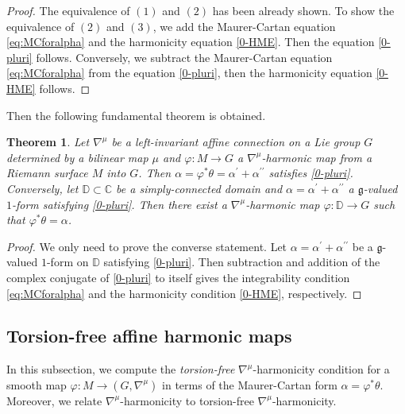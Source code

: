 \documentclass[12pt]{amsart}
\newtheorem{Theorem}{Theorem}[section]
\theoremstyle{definition}
\theoremstyle{remark}
\numberwithin{equation}{section}
\begin{document}
\begin{proof}
 The equivalence of $(1)$ and $(2)$ has been already shown.
 To show the equivalence of $(2)$ and $(3)$, we add the Maurer-Cartan equation 
 \eqref{eq:MCforalpha} and the harmonicity equation \eqref{0-HME}.
 Then the equation \eqref{0-pluri} follows. Conversely, we subtract  
 the  Maurer-Cartan equation \eqref{eq:MCforalpha} from  the equation \eqref{0-pluri}, 
 then the harmonicity equation \eqref{0-HME} follows.
\end{proof}
 Then the following fundamental theorem is obtained.
 \begin{Theorem}\label{IntegrabilityTheorem}
 Let ${\nabla^{\mu}}$ be a left-invariant affine 
 connection on a Lie group $G$ determined by a bilinear map 
 $\mu$ and $\varphi:M\to G$ a ${\nabla^{\mu}}$-harmonic map
 from a Riemann surface $M$ into $G$. Then 
 $\alpha=\varphi^{*}\theta=\alpha^{\prime}+ \alpha^{\prime \prime}$ 
 satisfies \eqref{0-pluri}.
 Conversely, let $\mathbb{D} \subset \mathbb C$ be a simply-connected 
 domain and $\alpha=\alpha^{\prime}+\alpha^{\prime \prime}$ a 
 $\mathfrak{g}$-valued $1$-form satisfying \eqref{0-pluri}.
 Then there exist a ${\nabla^{\mu}}$-harmonic map
 $\varphi:\mathbb{D}\to G$ such that $\varphi^{*}\theta=\alpha$. 
\end{Theorem}
\begin{proof}
We only need to prove the converse statement.
 Let $\alpha = \alpha^{\prime}+\alpha^{\prime \prime}$ be a
  $\mathfrak g$-valued $1$-form on $\mathbb{D}$ satisfying \eqref{0-pluri}. 
 Then subtraction and addition of the complex conjugate 
 of \eqref{0-pluri} to itself
 gives the integrability condition \eqref{eq:MCforalpha} 
 and the harmonicity condition \eqref{0-HME}, respectively.
\end{proof}
\subsection{Torsion-free affine harmonic maps}
 In this subsection, we compute the \textit{torsion-free} ${\nabla^{\mu}}$-harmonicity
 condition for a smooth map $\varphi:M\to (G,{\nabla^{\mu}})$ in terms of 
 the Maurer-Cartan form $\alpha=\varphi^{*}\theta$.
 Moreover, we relate  ${\nabla^{\mu}}$-harmonicity 
 to torsion-free ${\nabla^{\mu}}$-harmonicity.
\end{document}

